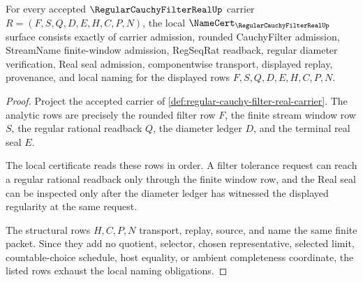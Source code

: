 \begin{theorem}
\label{thm:regular-cauchy-filter-real-namecert-obligations}
For every accepted $\RegularCauchyFilterRealUp$ carrier $R=(F,S,Q,D,E,H,C,P,N)$, the local $\NameCert_{\RegularCauchyFilterRealUp}$ surface consists exactly of carrier admission, rounded CauchyFilter admission, StreamName finite-window admission, RegSeqRat readback, regular diameter verification, Real seal admission, componentwise transport, displayed replay, provenance, and local naming for the displayed rows $F,S,Q,D,E,H,C,P,N$.
\end{theorem}
\begin{proof}
Project the accepted carrier of \autoref{def:regular-cauchy-filter-real-carrier}. The analytic rows are precisely the rounded filter row $F$, the finite stream window row $S$, the regular rational readback $Q$, the diameter ledger $D$, and the terminal real seal $E$.

The local certificate reads these rows in order. A filter tolerance request can reach a regular rational readback only through the finite window row, and the Real seal can be inspected only after the diameter ledger has witnessed the displayed regularity at the same request.

The structural rows $H,C,P,N$ transport, replay, source, and name the same finite packet. Since they add no quotient, selector, chosen representative, selected limit, countable-choice schedule, host equality, or ambient completeness coordinate, the listed rows exhaust the local naming obligations.
\end{proof}

